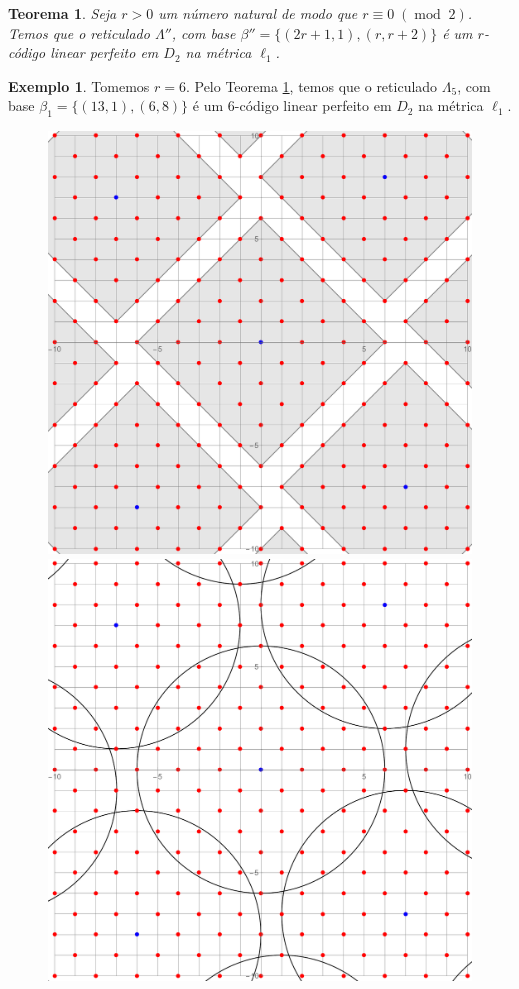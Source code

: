 \documentclass{article}
\theoremstyle{plain}
\newtheorem{theorem}{Teorema}
\theoremstyle{definition}
\newtheorem{example}{Exemplo}
\theoremstyle{remark}
\DeclareMathOperator{\modu}{mod}
\begin{document}
\begin{theorem}\label{cods2}
  Seja $r>0$ um número natural de modo que $r \equiv 0\;(\modu\;2)$. Temos que o reticulado $\Lambda''$, com base $\beta'' = \{(2r+1,1),(r,r+2)\}$ é um $r$-código linear perfeito em $D_2$ na métrica $\ell_1$.
\end{theorem}

\begin{example}
  Tomemos $r=6$. Pelo Teorema \ref{cods2}, temos que o reticulado $\Lambda_5$, com base $\beta_1=\{(13,1),(6,8)\}$ é um $6$-código linear perfeito em $D_2$ na métrica $\ell_1$.
  \begin{figure}[ht]
    \centering
    \includegraphics[scale=0.2]{code2r6l1.pdf}\;\;\;\;\includegraphics[scale=0.2]{code2r6l2.pdf}

\end{figure}
\end{example}
\end{document}
